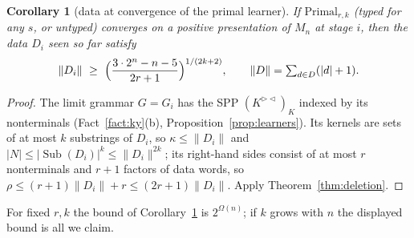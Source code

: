 \documentclass[11pt]{article}
\numberwithin{equation}{section}
\theoremstyle{plain}
\newtheorem{corollary}[theorem]{Corollary}
\theoremstyle{definition}
\theoremstyle{remark}
\theoremstyle{plain}
\newcommand{\RL}{^{\rhd\lhd}}
\newcommand{\Sub}{\operatorname{Sub}}
\begin{document}
\begin{corollary}[data at convergence of the primal learner]\label{cor:primal-data}
If $\mathrm{Primal}_{r,k}$ (typed for any $s$, or untyped) converges on a
positive presentation of $M_n$ at stage $i$, then the data $D_i$ seen so far
satisfy
\[
\|D_i\|\ \ge\ \Bigl(\frac{3\cdot2^n-n-5}{2r+1}\Bigr)^{1/(2k+2)},
\qquad \|D\|=\textstyle\sum_{d\in D}(|d|+1).
\]
\end{corollary}
\begin{proof}
The limit grammar $G=G_i$ has the SPP $(K\RL)_K$ indexed by its
nonterminals (Fact~\ref{fact:ky}(b), Proposition~\ref{prop:learners}).  Its
kernels are sets of at most $k$ substrings of $D_i$, so $\kappa\le\|D_i\|$ and
$|N|\le|\Sub(D_i)|^k\le\|D_i\|^{2k}$; its right-hand sides consist of at most
$r$ nonterminals and $r+1$ factors of data words, so
$\rho\le(r+1)\|D_i\|+r\le(2r+1)\|D_i\|$.  Apply Theorem~\ref{thm:deletion}.
\end{proof}
For fixed $r,k$ the bound of Corollary~\ref{cor:primal-data} is
$2^{\Omega(n)}$; if $k$ grows with $n$ the displayed bound is all we claim.
\end{document}
